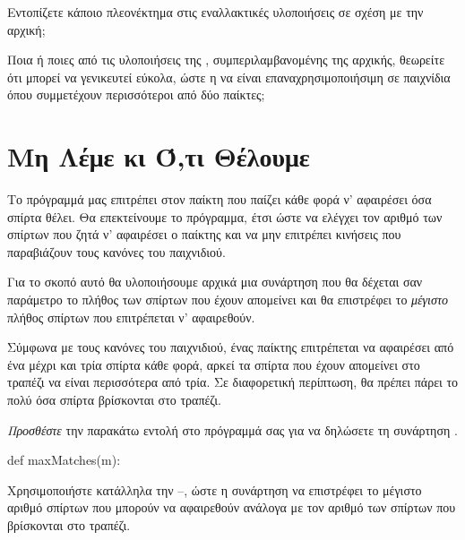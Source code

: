 \documentclass[a4paper,11pt,oneside]{book}
\begin{document}
\begin{step}
\marginnote[14pt]{\icondiscuss}
\dottedline

\dottedline

Εντοπίζετε κάποιο πλεονέκτημα στις εναλλακτικές υλοποιήσεις σε σχέση με την αρχική;

\marginnote[14pt]{\icondiscuss}
\dottedline

\dottedline

Ποια ή ποιες από τις υλοποιήσεις της ,  συμπεριλαμβανομένης της αρχικής, θεωρείτε ότι μπορεί να γενικευτεί εύκολα, ώστε η  να είναι επαναχρησιμοποιήσιμη σε παιχνίδια όπου συμμετέχουν περισσότεροι από δύο παίκτες;

\marginnote[14pt]{\icondiscuss}
\dottedline

\end{step}

\section{Μη Λέμε κι Ό,τι Θέλουμε}

Το πρόγραμμά μας επιτρέπει στον παίκτη που παίζει κάθε φορά ν' αφαιρέσει όσα σπίρτα θέλει. Θα επεκτείνουμε το πρόγραμμα, έτσι ώστε να ελέγχει τον αριθμό των σπίρτων που ζητά ν' αφαιρέσει ο παίκτης και να μην επιτρέπει κινήσεις που παραβιάζουν τους κανόνες του παιχνιδιού. 

\begin{step}
Για το σκοπό αυτό θα υλοποιήσουμε αρχικά μια συνάρτηση που θα δέχεται σαν παράμετρο το πλήθος  των σπίρτων που έχουν απομείνει και θα επιστρέφει το \emph{μέγιστο} πλήθος σπίρτων που επιτρέπεται ν' αφαιρεθούν. 

Σύμφωνα με τους κανόνες του παιχνιδιού, ένας παίκτης επιτρέπεται να αφαιρέσει από ένα μέχρι και τρία σπίρτα κάθε φορά, αρκεί τα σπίρτα που έχουν απομείνει στο τραπέζι να είναι περισσότερα από τρία. Σε διαφορετική περίπτωση, θα πρέπει πάρει το πολύ όσα σπίρτα βρίσκονται στο τραπέζι.

\emph{Προσθέστε} την παρακάτω εντολή στο πρόγραμμά σας για να δηλώσετε τη συνάρτηση .

\begin{pynew}
def maxMatches(m):
\end{pynew}


Χρησιμοποιήστε κατάλληλα την --, ώστε η συνάρτηση να επιστρέφει το μέγιστο αριθμό σπίρτων που μπορούν να αφαιρεθούν ανάλογα με τον αριθμό των σπίρτων  που βρίσκονται στο τραπέζι. 
\end{step}
\end{document}
